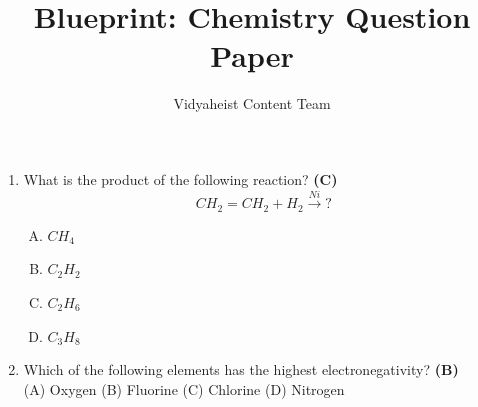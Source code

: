 \documentclass{article}
\begin{document}
\title{Blueprint: Chemistry Question Paper}
\author{Vidyaheist Content Team}
\date{}
\maketitle

\begin{enumerate}

    \item What is the product of the following reaction? \hfill \textbf{(C)}
    \begin{equation*}
        CH_2=CH_2 + H_2 \xrightarrow{Ni} \text{?}
    \end{equation*}
    \begin{enumerate}[(A)]
        \item $CH_4$
        \item $C_2H_2$
        \item $C_2H_6$
        \item $C_3H_8$
    \end{enumerate}

    \item Which of the following elements has the highest electronegativity? \hfill \textbf{(B)}
    \\(A) Oxygen (B) Fluorine (C) Chlorine (D) Nitrogen

\end{enumerate}
\end{document}
